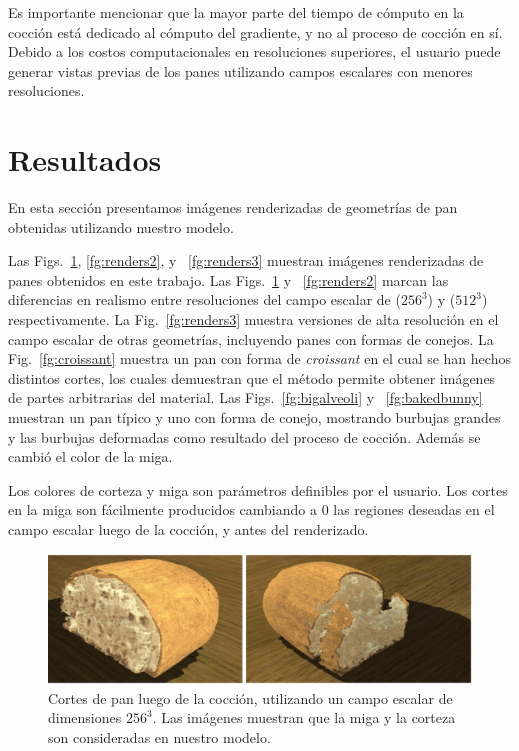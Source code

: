 \documentclass[spanish,a4paper,openright,11pt]{book}
\begin{document}
Es importante mencionar que la mayor parte del tiempo de cómputo en la cocción está dedicado al cómputo del gradiente, y no al proceso de cocción en sí.
Debido a los costos computacionales en resoluciones superiores, el usuario puede generar vistas previas de los panes utilizando campos escalares con menores resoluciones.


\section{Resultados}
En esta sección presentamos imágenes renderizadas de geometrías de pan obtenidas utilizando nuestro modelo.

Las Figs.~\ref{fg:renders}, \ref{fg:renders2}, y ~\ref{fg:renders3} muestran imágenes renderizadas de panes obtenidos en este trabajo.
Las Figs.~\ref{fg:renders} y ~\ref{fg:renders2} marcan las diferencias en realismo entre resoluciones del campo escalar de ($256^{3}$) y  ($512^{3}$) respectivamente.
La Fig.~\ref{fg:renders3} muestra versiones de alta resolución en el campo escalar de otras geometrías, incluyendo panes con formas de conejos.
La Fig.~\ref{fg:croissant} muestra un pan con forma de {\em croissant} en el cual se han hechos distintos cortes, los cuales demuestran que el método permite obtener imágenes de partes arbitrarias del material.
Las Figs.~\ref{fg:bigalveoli} y ~\ref{fg:bakedbunny} muestran un pan típico y uno con forma de conejo, mostrando burbujas grandes y las burbujas deformadas como resultado del proceso de cocción.
Además se cambió el color de la miga.

Los colores de corteza y miga son parámetros definibles por el usuario. Los cortes en la miga son fácilmente producidos cambiando a $0$ las regiones deseadas en el campo escalar luego de la cocción, y antes del renderizado.

\begin{figure}[!ht]
\begin{center}
\includegraphics[width=15cm]{figures/otherbread}
\caption{Cortes de pan luego de la cocción, utilizando un campo escalar de dimensiones $256^{3}$. Las imágenes muestran que la miga y la corteza son consideradas en nuestro modelo.}
\label{fg:renders}
\end{center}
\end{figure}
\end{document}
